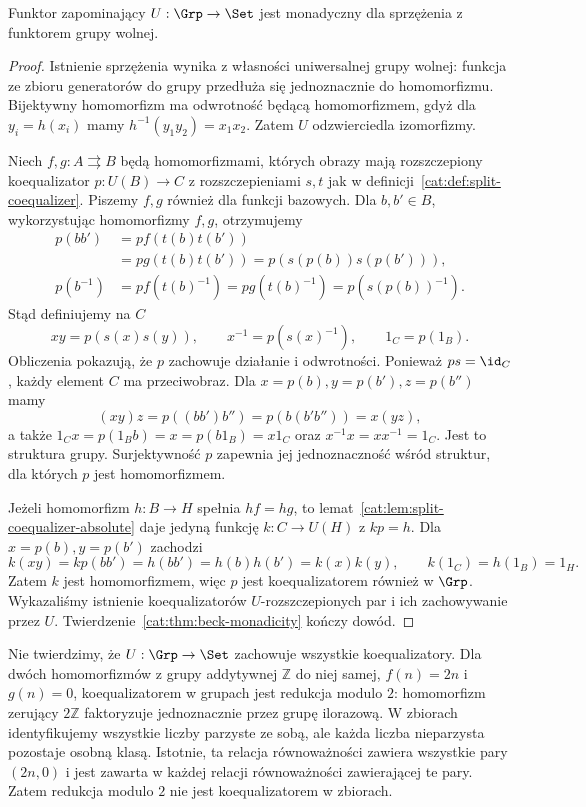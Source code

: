 \begin{stwierdzenie}\label{cat:prop:beck-groups}
Funktor zapominający $U:\Grp\to\Set$ jest monadyczny dla sprzężenia z funktorem grupy wolnej.
\end{stwierdzenie}
\begin{proof}
Istnienie sprzężenia wynika z własności uniwersalnej grupy wolnej: funkcja ze zbioru generatorów do grupy przedłuża się jednoznacznie do homomorfizmu. Bijektywny homomorfizm ma odwrotność będącą homomorfizmem, gdyż dla $y_i=h(x_i)$ mamy $h^{-1}(y_1y_2)=x_1x_2$. Zatem $U$ odzwierciedla izomorfizmy.

Niech $f,g:A\rightrightarrows B$ będą homomorfizmami, których obrazy mają rozszczepiony koequalizator $p:U(B)\to C$ z rozszczepieniami $s,t$ jak w definicji~\ref{cat:def:split-coequalizer}. Piszemy $f,g$ również dla funkcji bazowych. Dla $b,b'\in B$, wykorzystując homomorfizmy $f,g$, otrzymujemy
\begin{align*}
 p(bb')&=pf(t(b)t(b'))\\
 &=pg(t(b)t(b'))=p(s(p(b))s(p(b'))),\\
 p(b^{-1})&=pf(t(b)^{-1})=pg(t(b)^{-1})
 =p(s(p(b))^{-1}).
\end{align*}
Stąd definiujemy na $C$
\[
 xy=p(s(x)s(y)),\qquad x^{-1}=p(s(x)^{-1}),
 \qquad 1_C=p(1_B).
\]
Obliczenia pokazują, że $p$ zachowuje działanie i odwrotności. Ponieważ $ps=\id_C$, każdy element $C$ ma przeciwobraz. Dla $x=p(b),y=p(b'),z=p(b'')$ mamy
\[
 (xy)z=p((bb')b'')=p(b(b'b''))=x(yz),
\]
a także $1_Cx=p(1_Bb)=x=p(b1_B)=x1_C$ oraz
$x^{-1}x=xx^{-1}=1_C$. Jest to struktura grupy. Surjektywność $p$ zapewnia jej jednoznaczność wśród struktur, dla których $p$ jest homomorfizmem.

Jeżeli homomorfizm $h:B\to H$ spełnia $hf=hg$, to lemat~\ref{cat:lem:split-coequalizer-absolute} daje jedyną funkcję $k:C\to U(H)$ z $kp=h$. Dla $x=p(b),y=p(b')$ zachodzi
\[
 k(xy)=kp(bb')=h(bb')=h(b)h(b')=k(x)k(y),
 \qquad k(1_C)=h(1_B)=1_H.
\]
Zatem $k$ jest homomorfizmem, więc $p$ jest koequalizatorem również w $\Grp$. Wykazaliśmy istnienie koequalizatorów $U$-rozszczepionych par i ich zachowywanie przez $U$. Twierdzenie~\ref{cat:thm:beck-monadicity} kończy dowód.
\end{proof}
Nie twierdzimy, że $U:\Grp\to\Set$ zachowuje wszystkie koequalizatory. Dla dwóch homomorfizmów z grupy addytywnej $\mathbb Z$ do niej samej, $f(n)=2n$ i $g(n)=0$, koequalizatorem w grupach jest redukcja modulo $2$: homomorfizm zerujący $2\mathbb Z$ faktoryzuje jednoznacznie przez grupę ilorazową. W zbiorach identyfikujemy wszystkie liczby parzyste ze sobą, ale każda liczba nieparzysta pozostaje osobną klasą. Istotnie, ta relacja równoważności zawiera wszystkie pary $(2n,0)$ i jest zawarta w każdej relacji równoważności zawierającej te pary. Zatem redukcja modulo $2$ nie jest koequalizatorem w zbiorach.

